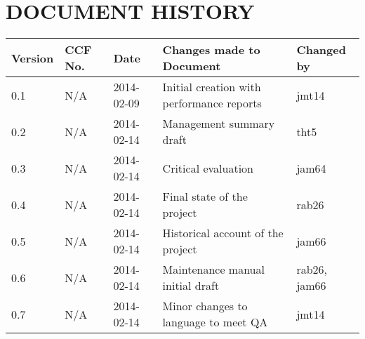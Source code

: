 \documentclass{project}
\begin{document}
\section*{DOCUMENT HISTORY}
\begin{tabular}{|l | l | l | l | l |}
\hline
Version & CCF No. & Date & Changes made to Document & Changed by \\
\hline
0.1 & N/A & 2014-02-09 & Initial creation with performance reports & jmt14 \\
\hline
0.2 & N/A & 2014-02-14 & Management summary draft & tht5 \\
\hline
0.3 & N/A & 2014-02-14 & Critical evaluation & jam64 \\
\hline
0.4 & N/A & 2014-02-14 & Final state of the project & rab26 \\
\hline
0.5 & N/A & 2014-02-14 & Historical account of the project & jam66 \\
\hline
0.6 & N/A & 2014-02-14 & Maintenance manual initial draft & rab26, jam66 \\
\hline
0.7 & N/A & 2014-02-14 & Minor changes to language to meet QA & jmt14 \\
\hline
\end{tabular}
\label{thelastpage}
\end{document}
